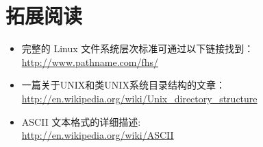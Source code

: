 \section{拓展阅读} %
\label{sec:拓展阅读4}

\begin{itemize}
	\item 完整的 Linux 文件系统层次标准可通过以下链接找到：\\
	\url{http://www.pathname.com/fhs/}
	\item 一篇关于UNIX和类UNIX系统目录结构的文章：\\
	\url{http://en.wikipedia.org/wiki/Unix_directory_structure}
	\item ASCII 文本格式的详细描述: \\
	\url{http://en.wikipedia.org/wiki/ASCII}
\end{itemize}
